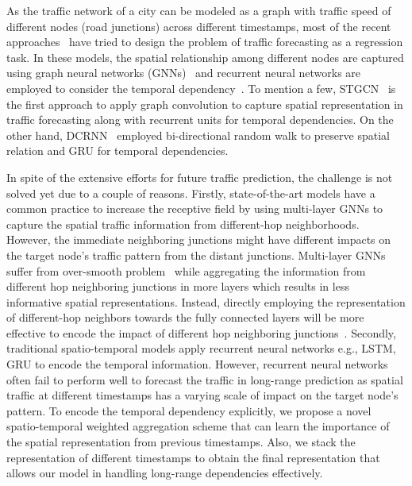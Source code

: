 \documentclass[runningheads]{llncs}
\begin{document}
As the traffic network of a city can be modeled as a graph with traffic speed of different nodes (road junctions) across different timestamps, most of the recent approaches~\cite{li2017diffusion,wu2019graph,guo2019attention,park2019stgrat,chen2019gated,fang2019gstnet,ijcai2020-326,wu2019graph} have tried to design the problem of traffic forecasting as a regression task. In these models, the spatial relationship among different nodes are captured using graph neural networks (GNNs)~\cite{kipf2016semi,hamilton2017inductive} and recurrent neural networks are employed to consider the temporal dependency~\cite{yu2017spatio}. To mention a few, STGCN~\cite{yu2017spatio} is the first approach to apply graph convolution to capture spatial representation in traffic forecasting along with recurrent units for temporal dependencies. On the other hand, DCRNN~\cite{li2017diffusion} employed bi-directional random walk to preserve spatial relation and GRU for temporal dependencies. 


In spite of the extensive efforts for future traffic prediction, the challenge is not solved yet due to a couple of reasons. Firstly, state-of-the-art models have a common practice to increase the receptive field by using multi-layer GNNs to capture the spatial traffic information from different-hop neighborhoods. However, the immediate neighboring junctions might have different impacts on the target node's traffic pattern from the distant junctions. Multi-layer GNNs
suffer from over-smooth problem~\cite{chen2020measuring} while aggregating the information from different hop neighboring junctions in more layers which results in
less informative spatial representations.  Instead,
 directly employing the representation of different-hop neighbors towards the fully connected layers will be more effective to encode the impact of different hop neighboring junctions~\cite{zhu2020beyond}. 
Secondly, traditional spatio-temporal models apply recurrent neural networks e.g., LSTM, GRU to encode the temporal information. However, recurrent neural networks often fail to perform well to forecast the traffic in long-range prediction as spatial traffic at different timestamps has a varying scale of impact on the target node's pattern.   To encode the temporal dependency explicitly,  we propose a novel spatio-temporal weighted aggregation scheme that can learn the importance of the spatial representation from previous timestamps. Also, we stack the representation of different timestamps to obtain the final representation that allows our model in handling long-range dependencies effectively. 
\end{document}
